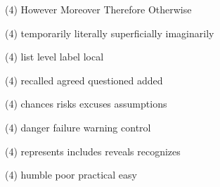 \item
\begin{tasks}(4)
	\task However
	\task Moreover
	\task Therefore
	\task Otherwise
\end{tasks}
\item
\begin{tasks}(4)
	\task temporarily
	\task literally
	\task superficially
	\task imaginarily
\end{tasks}
\item
\begin{tasks}(4)
	\task list
	\task level
	\task label
	\task local
\end{tasks}
\item
\begin{tasks}(4)
	\task recalled
	\task agreed
	\task questioned
	\task added
\end{tasks}
\item
\begin{tasks}(4)
	\task chances
	\task risks
	\task excuses
	\task assumptions
\end{tasks}
\item
\begin{tasks}(4)
	\task danger
	\task failure
	\task warning
	\task control
\end{tasks}
\item
\begin{tasks}(4)
	\task represents
	\task includes
	\task reveals
	\task recognizes
\end{tasks}
\item
\begin{tasks}(4)
	\task humble
	\task poor
	\task practical
	\task easy
\end{tasks}